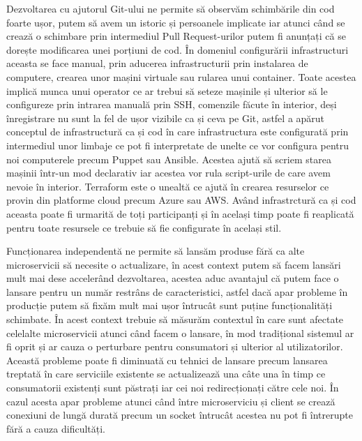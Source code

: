 Dezvoltarea cu ajutorul Git-ului ne permite să observăm schimbările din cod foarte ușor, 
putem să avem un istoric și persoanele implicate iar atunci când se crează o schimbare
prin intermediul Pull Request-urilor putem fi anunțați că se dorește modificarea unei porțiuni de cod.
În domeniul configurării infrastructuri aceasta se face manual, prin aducerea infrastructurii prin
instalarea de computere, crearea unor mașini virtuale sau rularea unui container. Toate acestea
implică munca unui operator ce ar trebui să seteze mașinile și ulterior să le configureze prin intrarea
manuală prin SSH, comenzile făcute în interior, deși înregistrare nu sunt la fel de ușor
vizibile ca și ceva pe Git, astfel a apărut conceptul de infrastructură ca și cod în care
infrastructura este configurată prin intermediul unor limbaje ce pot fi interpretate de 
unelte ce vor configura pentru noi computerele precum Puppet sau Ansible. Acestea ajută să
scriem starea mașinii într-un mod declarativ iar acestea vor rula script-urile de care avem nevoie
în interior. Terraform este o unealtă ce ajută în crearea resurselor ce provin din platforme cloud
precum Azure sau AWS. Având infrastrctură ca și cod aceasta poate fi urmarită de toți participanți și 
în același timp poate fi reaplicată pentru toate resursele ce trebuie să fie configurate în același
stil.

Funcționarea independentă ne permite să lansăm produse fără ca alte microservicii să necesite
o actualizare, în acest context putem să facem lansări mult mai dese accelerând dezvoltarea,
acestea aduc avantajul că putem face o lansare pentru un număr restrâns de caracteristici,
astfel dacă apar probleme în producție putem să fixăm mult mai ușor întrucât sunt puține
funcționalități schimbate. În acest context trebuie să măsurăm contextul în care 
sunt afectate celelalte microservicii atunci când facem o lansare, în mod tradițional
sistemul ar fi oprit și ar cauza o perturbare pentru consumatori și ulterior al utilizatorilor.
Această probleme poate fi diminuată cu tehnici de lansare precum lansarea treptată în care
serviciile existente se actualizează una câte una în timp ce consumatorii existenți sunt păstrați
iar cei noi redirecționați către cele noi. În cazul acesta apar probleme atunci când între 
microserviciu și client se crează conexiuni de lungă durată precum un socket întrucât acestea
nu pot fi întrerupte fără a cauza dificultăți.

